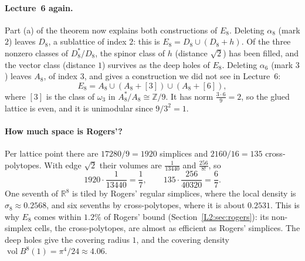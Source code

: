\documentclass[11pt,openany]{book}
\theoremstyle{plain}
\theoremstyle{definition}
\theoremstyle{remark}
\newcommand{\R}{\mathbb{R}}
\newcommand{\Z}{\mathbb{Z}}
\newcommand{\vol}{\operatorname{vol}}
\newcommand{\Ball}{B}                  %
\begin{document}
\paragraph{Lecture~6 again.} Part (a) of the theorem now explains both constructions of $E_8$. Deleting
$\alpha_8$ (mark $2$) leaves $D_8$, a sublattice of index $2$: this is $E_8=D_8\cup(D_8+h)$. Of the three
nonzero classes of $D_8^*/D_8$, the spinor class of $h$ (distance $\sqrt2$) has been filled, and the vector
class (distance $1$) survives as the deep holes of $E_8$. Deleting $\alpha_6$ (mark $3$) leaves $A_8$, of
index $3$, and gives a construction we did not see in Lecture~6:
\[
  E_8=A_8\cup(A_8+[3])\cup(A_8+[6]),
\]
where $[3]$ is the class of $\omega_3$ in $A_8^*/A_8\cong\Z/9$. It has norm $\frac{3\cdot6}9=2$, so the
glued lattice is even, and it is unimodular since $9/3^2=1$.

\paragraph{How much space is Rogers'?} Per lattice point there are $17280/9=1920$ simplices and
$2160/16=135$ cross-polytopes. With edge $\sqrt2$ their volumes are $\frac1{13440}$ and $\frac{256}{8!}$, so
\[
  1920\cdot\frac1{13440}=\frac17,\qquad 135\cdot\frac{256}{40320}=\frac67 .
\]
One seventh of $\R^8$ is tiled by Rogers' regular simplices, where the local density is
$\sigma_8\approx0.2568$, and six sevenths by cross-polytopes, where it is about $0.2531$. This is why
$E_8$ comes within $1.2\%$ of Rogers' bound (Section~\ref{L2:sec:rogers}): its non-simplex cells,
the cross-polytopes, are almost as efficient as Rogers' simplices. The deep holes
give the covering radius $1$, and the covering density $\vol\Ball^8(1)=\pi^4/24\approx4.06$.
\end{document}
